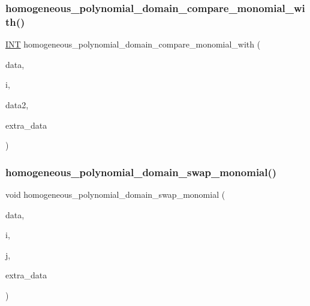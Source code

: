 \subsubsection{\texorpdfstring{homogeneous\+\_\+polynomial\+\_\+domain\+\_\+compare\+\_\+monomial\+\_\+with()}{homogeneous\_polynomial\_domain\_compare\_monomial\_with()}}
{\footnotesize\ttfamily \mbox{\hyperlink{galois_8h_a09fddde158a3a20bd2dcadb609de11dc}{I\+NT}} homogeneous\+\_\+polynomial\+\_\+domain\+\_\+compare\+\_\+monomial\+\_\+with (\begin{DoxyParamCaption}\item[{void $\ast$}]{data,  }\item[{\mbox{\hyperlink{galois_8h_a09fddde158a3a20bd2dcadb609de11dc}{I\+NT}}}]{i,  }\item[{\mbox{\hyperlink{galois_8h_a09fddde158a3a20bd2dcadb609de11dc}{I\+NT}} $\ast$}]{data2,  }\item[{void $\ast$}]{extra\+\_\+data }\end{DoxyParamCaption})}

\mbox{\label{homogeneous__polynomial__domain_8_c_a00f821ce38623272d3af11a66c3b6f34}} 
\subsubsection{\texorpdfstring{homogeneous\+\_\+polynomial\+\_\+domain\+\_\+swap\+\_\+monomial()}{homogeneous\_polynomial\_domain\_swap\_monomial()}}
{\footnotesize\ttfamily void homogeneous\+\_\+polynomial\+\_\+domain\+\_\+swap\+\_\+monomial (\begin{DoxyParamCaption}\item[{void $\ast$}]{data,  }\item[{\mbox{\hyperlink{galois_8h_a09fddde158a3a20bd2dcadb609de11dc}{I\+NT}}}]{i,  }\item[{\mbox{\hyperlink{galois_8h_a09fddde158a3a20bd2dcadb609de11dc}{I\+NT}}}]{j,  }\item[{void $\ast$}]{extra\+\_\+data }\end{DoxyParamCaption})}

